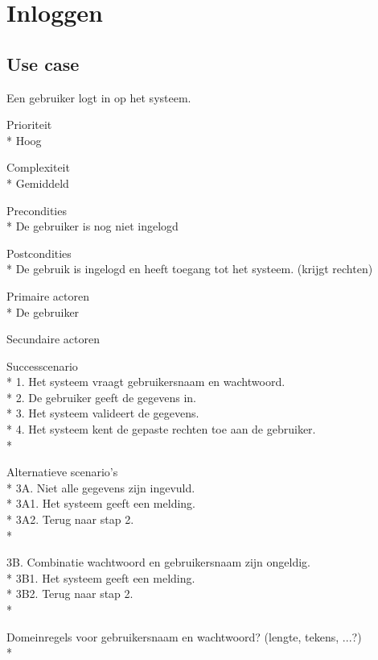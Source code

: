 \documentclass[pdftex,a4paper,12pt,twoside]{report}
\begin{document}
\newpage
\section{Inloggen}
\subsection{Use case}
Een gebruiker logt in op het systeem.

Prioriteit\\*
Hoog

Complexiteit\\*
Gemiddeld

Precondities \\*
De gebruiker is nog niet ingelogd

Postcondities \\*
De gebruik is ingelogd en heeft toegang tot het systeem. (krijgt rechten)

Primaire actoren\\*
De gebruiker

Secundaire actoren 

Successcenario\\*
1.	Het systeem vraagt gebruikersnaam en wachtwoord.\\*
2.	De gebruiker geeft de gegevens in.\\*
3.	Het systeem valideert de gegevens.\\*
4.	Het systeem kent de gepaste rechten toe aan de gebruiker.\\*

Alternatieve scenario’s\\*
3A. Niet alle gegevens zijn ingevuld.\\*
3A1. Het systeem geeft een melding.\\*
3A2. Terug naar stap 2.\\*

3B. Combinatie wachtwoord en gebruikersnaam zijn ongeldig.\\*
3B1. Het systeem geeft een melding.\\*
3B2. Terug naar stap 2.\\*

Domeinregels voor gebruikersnaam en wachtwoord? (lengte, tekens, ...?)\\*
\end{document}
